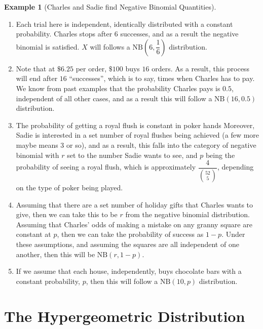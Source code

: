 \documentclass[
  letterpaper,
  DIV=11,
  numbers=noendperiod]{scrreprt}
\providecommand{\tightlist}{%
  \setlength{\itemsep}{0pt}\setlength{\parskip}{0pt}}\usepackage{longtable,booktabs,array}
\theoremstyle{definition}
\theoremstyle{definition}
\newtheorem{example}{Example}[chapter]
\theoremstyle{definition}
\theoremstyle{remark}
\begin{document}
\begin{example}[Charles and Sadie find Negative Binomial
Quantities]
\begin{tcolorbox}[enhanced jigsaw, colback=white, colframe=quarto-callout-color-frame, arc=.35mm, leftrule=.75mm, rightrule=.15mm, opacityback=0, breakable, bottomrule=.15mm, left=2mm, toprule=.15mm]
\begin{enumerate}
\def\labelenumi{\alph{enumi}.}
\tightlist
\item
  Each trial here is independent, identically distributed with a
  constant probability. Charles stops after \(6\) successes, and as a
  result the negative binomial is satisfied. \(X\) will follows a
  \(\text{NB}(6, \dfrac{1}{6})\) distribution.
\item
  Note that at \(\$6.25\) per order, \(\$100\) buys \(16\) orders. As a
  result, this process will end after \(16\) ``successes'', which is to
  say, times when Charles has to pay. We know from past examples that
  the probability Charles pays is \(0.5\), independent of all other
  cases, and as a result this will follow a \(\text{NB}(16, 0.5)\)
  distribution.
\item
  The probability of getting a royal flush is constant in poker
  hands\footnotemark{} Moreover, Sadie is interested in a set number of
  royal flushes being achieved (a few more maybe means \(3\) or so), and
  as a result, this falls into the category of negative binomial with
  \(r\) set to the number Sadie wants to see, and \(p\) being the
  probability of seeing a royal flush, which is approximately
  \(\dfrac{4}{\binom{52}{5}}\), depending on the type of poker being
  played.
\item
  Assuming that there are a set number of holiday gifts that Charles
  wants to give, then we can take this to be \(r\) from the negative
  binomial distribution. Assuming that Charles' odds of making a mistake
  on any granny square are constant at \(p\), then we can take the
  probability of success as \(1-p\). Under these assumptions, and
  assuming the squares are all independent of one another, then this
  will be \(\text{NB}(r, 1-p)\).
\item
  If we assume that each house, independently, buys chocolate bars with
  a constant probability, \(p\), then this will follow a
  \(\text{NB}(10, p)\) distribution.
\end{enumerate}

\end{tcolorbox}


\end{example}

\section{The Hypergeometric
Distribution}\label{the-hypergeometric-distribution}
\end{document}
